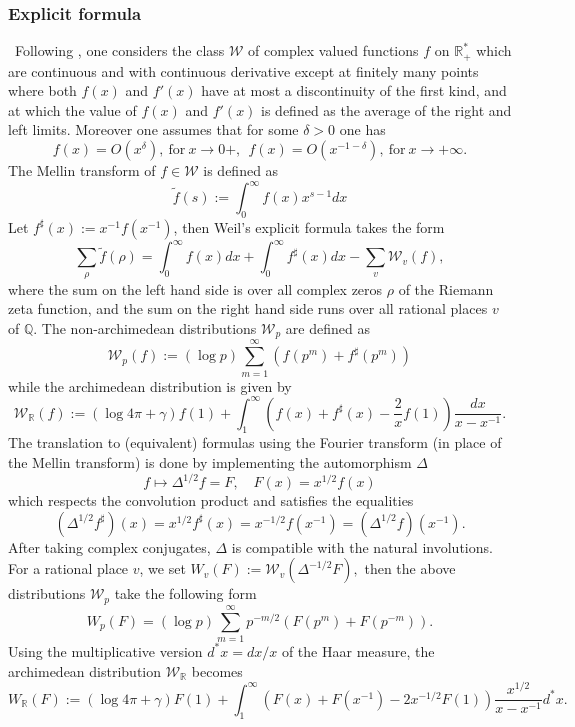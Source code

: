 \documentclass[cupthm]{CUP-JNL-JMJ}
\def\Q{{\mathbb Q}}
\def\R{{\mathbb R}}
\def\cW{{\mathcal W}}
\numberwithin{equation}{section}
\theoremstyle{cupplain}
\theoremstyle{cupdefinition}
\theoremstyle{cupremark}
\theoremstyle{cupproof}
\begin{document}
\subsubsection{Explicit formula}\label{subsectexplicit}
~Following \cite{EB}, one considers the class $\cW$ of complex valued functions $f$ on $\R^*_+$ which are continuous and with continuous derivative except  at finitely many points where both $f(x)$ and $f'(x)$ have at most a discontinuity of the first kind, and at which the value of $f(x)$ and $f'(x)$ is defined as the average of the right and left limits. Moreover one assumes  that for some $\delta>0$ one has 
$$
f(x)=O(x^\delta), \ \text{for} \ x\to 0+, \ \ f(x)=O(x^{-1-\delta}), \ \text{for} \ x\to +\infty.
$$  
The Mellin transform of   $f \in \cW$ is defined as
\begin{equation}\label{mellin}
 \tilde f(s):=\int_0^\infty f(x)x^{s-1}dx
 \end{equation}
Let $f^\sharp(x):=x^{-1}f(x^{-1})$, then Weil's explicit formula takes the form 
 \begin{equation}\label{bombieriexplicit}
 \sum_{\rho}\tilde f(\rho)=\int_0^\infty f(x)dx+\int_0^\infty f^\sharp(x)dx-\sum_v {\mathcal W}_v(f),
 \end{equation}
 where the  sum on the left hand side is over all complex zeros $\rho$ of the Riemann zeta function, and the sum on the right hand side   runs over all rational places  $v$ of $\Q$. The non-archimedean distributions $\mathcal W_p$ are defined as 
 \begin{equation}\label{bombieriexplicit1}
 {\mathcal W}_p(f):=(\log p)\sum_{m=1}^\infty\left(f(p^m)+f^\sharp(p^m)\right)
 \end{equation}
while the archimedean distribution is given by 
 \begin{equation}\label{bombieriexplicit2}
 {\mathcal W}_\R(f):=(\log 4\pi +\gamma)f(1)+\int_{1}^\infty\left(f(x)+f^\sharp(x)-\frac 2x f(1)\right)\frac{dx}{x-x^{-1}}.
 \end{equation}
 The  translation to (equivalent) formulas using the Fourier transform (in place of the Mellin transform) is done  by implementing the  automorphism $\Delta$ 
 \begin{equation}\label{MF1}
f\mapsto \Delta^{1/2}f=F, \quad F(x)= x^{1/2}f(x)
\end{equation}
which respects the convolution product and  satisfies the equalities
$$
(\Delta^{1/2}f^\sharp)(x)=x^{1/2}f^\sharp(x)=x^{-1/2}f(x^{-1})=(\Delta^{1/2}f)(x^{-1}).
$$
After taking complex conjugates, $\Delta$ is compatible with the natural involutions. 
For a rational place $v$,  we set 
$W_v(F):={\mathcal W}_v(\Delta^{-1/2}F),$   then  the above distributions $\mathcal W_p$ take the following  form
\begin{equation}\label{bombieriexplicit1bis}
 W_p(F)=(\log p)\sum_{m=1}^\infty p^{-m/2}\left(F(p^m)+F(p^{-m})\right).
 \end{equation}
 Using the multiplicative version $d^*x=dx/x$ of the Haar measure, the archimedean distribution $\mathcal W_\R$ becomes
 \begin{equation}\label{bombieriexplicit2bis}
 W_\R(F):=(\log 4\pi +\gamma)F(1)+\int_{1}^\infty\left(F(x)+F(x^{-1})-2x^{-1/2} F(1)\right)\frac{x^{1/2}}{x-x^{-1}}d^*x.
 \end{equation}
\end{document}
